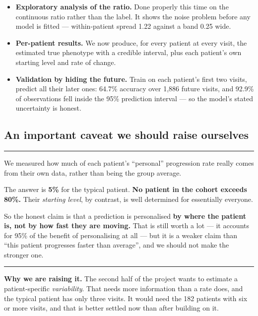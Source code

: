 \documentclass[11pt,a4paper]{article}
\newenvironment{found}
  {\begin{center}\begin{minipage}{0.95\textwidth}%
   \vspace{4pt}\hrule\vspace{6pt}\small}
  {\vspace{6pt}\hrule\vspace{4pt}\end{minipage}\end{center}}
\begin{document}
\begin{itemize}
  \item \textbf{Exploratory analysis of the ratio.} Done properly this time on
        the continuous ratio rather than the label. It shows the noise problem
        before any model is fitted --- within-patient spread 1.22 against a band
        0.25 wide.

  \item \textbf{Per-patient results.} We now produce, for every patient at every
        visit, the estimated true phenotype with a credible interval, plus each
        patient's own starting level and rate of change.

  \item \textbf{Validation by hiding the future.} Train on each patient's first
        two visits, predict all their later ones: 64.7\% accuracy over 1{,}886
        future visits, and 92.9\% of observations fell inside the 95\%
        prediction interval --- so the model's stated uncertainty is honest.
\end{itemize}

\subsection*{An important caveat we should raise ourselves}

\begin{found}
We measured how much of each patient's ``personal'' progression rate really
comes from their own data, rather than being the group average.

The answer is \textbf{5\%} for the typical patient. \textbf{No patient in the
cohort exceeds 80\%.} Their \emph{starting level}, by contrast, is well
determined for essentially everyone.

So the honest claim is that a prediction is personalised \textbf{by where the
patient is, not by how fast they are moving.} That is still worth a lot --- it
accounts for 95\% of the benefit of personalising at all --- but it is a weaker
claim than ``this patient progresses faster than average'', and we should not
make the stronger one.
\end{found}

\textbf{Why we are raising it.} The second half of the project wants to estimate
a patient-specific \emph{variability}. That needs more information than a rate
does, and the typical patient has only three visits. It would need the 182
patients with six or more visits, and that is better settled now than after
building on it.
\end{document}
